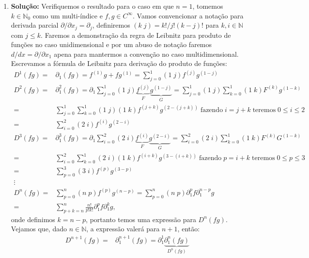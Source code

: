 \documentclass{article}
\begin{document}
\begin{enumerate}
		\item \textbf{Solução:} Verifiquemos o resultado para o caso em que $n =1$, tomemos $k \in \mathbb{N}_{0}$ como um multi-índice e $f, g \in C^{\infty}$. Vamos convencionar a notação para derivada parcial $\partial/\partial {x_{j}} = \partial_{j}$, definiremos $(k \; j) = k!/j!(k-j)!$ para $k, i \in \mathbb{N}$ com $j \leq k$. Faremos a demonstração da regra de Leibnitz para produto de funções no caso unidimensional e por um abuso de notação faremos $d/dx = \partial/\partial {x_{1}}$ apena para mantermos a convenção no caso multidimensional. Escrevamos a fórmula de Leibnitz para derivação do produto de funções:
		$$
		\begin{aligned}
		D^{1} (fg)
		= & \partial_{1} (fg) = f^{(1)}g + fg^{(1)} = \sum_{j=0}^{1} (1 \; j)f^{(j)}g^{(1-j)} \\
		D^{2} (fg)
		= & \partial^{2}_{1} (fg) = \partial_{1} \sum_{j=0}^{1} (1 \; j) \underbrace{f^{(j)}}_{F} \underbrace{g^{(1-j)}}_{G} = \sum_{j=0}^{1} (1 \; j)\sum_{k=0}^{1} (1 \; k)F^{(k)}g^{(1-k)} \\
		= & \sum_{j=0}^{1} \sum_{k=0}^{1} (1 \; j) (1 \; k)f^{(j+k)}g^{(2-(j+k))} \; \text{fazendo} \; i = j+k \; \text{teremos} \; 0 \leq i \leq 2 \\
		= & \sum_{i=0}^{2} (2 \; i) f^{(i)} g^{(2-i)} \\
		D^{3} (fg)
		= & \partial^{3}_{1} (fg) = \partial_{1} \sum_{i=0}^{2} (2 \; i) \underbrace{f^{(i)}}_{F} \underbrace{g^{(2-i)}}_{G} = \sum_{i=0}^{2} (2 \; i) \sum_{k=0}^{1} (1 \; k)F^{(k)} G^{(1-k)} \\
		= & \sum_{i=0}^{2} \sum_{k=0}^{1} (2 \; i)  (1 \; k) f^{(i+k)}g^{(3-(i+k))} \; \text{fazendo} \; p = i+k \; \text{teremos} \; 0 \leq p \leq 3 \\
		= & \sum_{p=0}^{3} (3 \; i) f^{(p)} g^{(3-p)} \\
		\vdots & \\
		D^{n} (fg) 
		= & \sum_{p=0}^{n} (n \; p) f^{(p)} g^{(n-p)} = \sum_{p=0}^{n} (n \; p) \partial^{p}_{1} f \partial^{n-p}_{1} g \\
		= &  \sum_{p + k = n}^{n} \frac{n!}{p!k!} \partial^{p}_{1} f \partial^{k}_{1} g,
		\end{aligned}
		$$
		onde definimos $k = n-p$, portanto temos uma expressão para $D^{n} (fg)$. Vejamos que, dado $n \in \mathbb{N}$, a expressão valerá para $n+1$, então:
		$$
		\begin{aligned}
		D^{n+1} (fg) 
		= & \partial^{n+1}_{1} (fg) = \partial^{1}_{1} \underbrace{\partial^{n}_{1}(fg)}_{D^{n} (fg)}
		\\

\end{aligned}$$
\end{enumerate}
\end{document}
